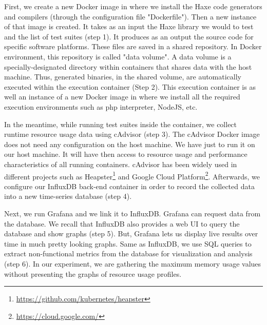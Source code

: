  

First, we create a new Docker image in where we install the Haxe code generators and compilers (through the configuration file "Dockerfile"). Then a new instance of that image is created. It takes as an input the Haxe library we would to test and the list of test suites (step 1). It produces as an output the source code for specific software platforms. These files are saved in a shared repository.
In Docker environment, this repository is called "data volume". A data volume is a specially-designated directory within containers that shares data with the host machine. 
Thus, generated binaries, in the shared volume, are automatically executed within the execution container (Step 2). This execution container is as well an instance of a new Docker image in where we install all the required execution environments such as php interpreter, NodeJS, etc. 

In the meantime, while running test suites inside the container, we collect runtime resource usage data using cAdvisor (step 3). The cAdvisor Docker image does not need any configuration on the host machine. We have just to run it on our host machine. It will have then access to resource usage and performance characteristics of all running containers. 
cAdvisor has been widely used in different projects such as Heapster\footnote{\url{https://github.com/kubernetes/heapster}} and Google Cloud Platform\footnote{\url{https://cloud.google.com/}}. 
Afterwards, we configure our InfluxDB back-end container in order to record the collected data into a new time-series database (step 4). %

Next, we run Grafana and we link it to InfluxDB. %
Grafana can  request data from the database. We recall that InfluxDB also provides a web UI to query the database and show graphs (step 5). But, Grafana lets us display live results over time in much pretty looking graphs. Same as InfluxDB, we use SQL queries to extract non-functional metrics from the database for visualization and analysis (step 6). In our experiment, we are gathering the maximum memory usage values without presenting the graphs of resource usage profiles.

